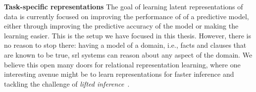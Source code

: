 \textbf{Task-specific representations}
The goal of learning latent representations of data is currently focused on improving the performance of of a predictive model, either through improving the predictive accuracy of the model or making the learning easier.
This is the setup we have focused in this thesis.
However, there is no reason to stop there: having a model of a domain, i.e., facts and clauses that are known to be true, \gls{srl} systems can reason about any aspect of the domain.
We believe this open many doors for relational representation learning, where one interesting avenue might be to learn representations for faster inference and tackling the challenge of \textit{lifted inference}~\cite{VdBThesis13}.










\cleardoublepage

